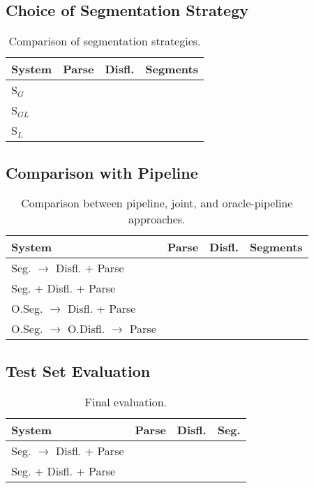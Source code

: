 \documentclass[11pt,letterpaper]{article}
\begin{document}
\subsection{Choice of Segmentation Strategy}

\begin{table}
    \centering
    \small
    \begin{tabular}{l|rrr}
        System & Parse & Disfl. & Segments \\
        \hline \hline
        S$_G$ & & & \\
        S$_{GL}$  & & & \\
        S$_L$  & & & \\
        \hline
    \end{tabular}
    \caption{\small Comparison of segmentation strategies.}
\end{table}


\subsection{Comparison with Pipeline}

\begin{table}
    \centering
    \small
    \begin{tabular}{l|rrr}
        System & Parse & Disfl. & Segments \\
        \hline \hline
        Seg. $\rightarrow$ Disfl. + Parse & & & \\
        Seg. + Disfl. + Parse  & & & \\
        \hline
        O.Seg. $\rightarrow$ Disfl. + Parse & & & \\
        O.Seg. $\rightarrow$ O.Disfl. $\rightarrow$ Parse & & & \\
        \hline

    \end{tabular}
    \caption{\small Comparison between pipeline, joint, and oracle-pipeline
             approaches.}
\end{table}


\subsection{Test Set Evaluation}

\begin{table}
    \centering
    \small
    \begin{tabular}{l|rrr}
        System & Parse & Disfl. & Seg. \\
        \hline \hline
        Seg. $\rightarrow$ Disfl. + Parse & & & \\
        Seg. + Disfl. + Parse  & & & \\
    \end{tabular}
    \caption{\small Final evaluation.}
\end{table}





\end{document}
